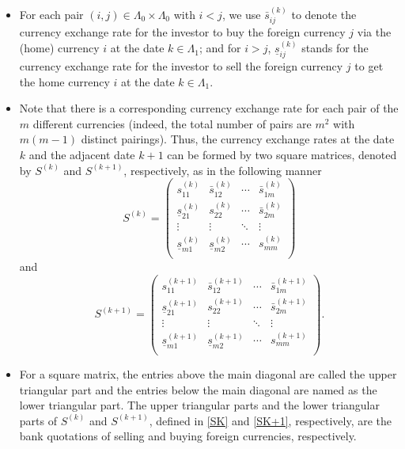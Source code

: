 \documentclass[11pt]{article}
\numberwithin{equation}{section}
\begin{document}
 \begin{itemize}
    \item For  each pair  $(i,j)\in\Lambda_0\times\Lambda_0$ with $i<j$,   we use $\bar s_{ij}^{(k)} $  to denote the currency exchange rate for the investor to buy the  foreign currency $j$ via the (home) currency $i$ at the date $k\in\Lambda_1$; and  
    for  $i>j$, $\underline s_{ij}^{(k)}$ stands for the currency exchange rate for the investor to sell the foreign currency $j$ to get the home currency $i$ at the date $k\in\Lambda_1$. 
    
 \item  Note that  there is a corresponding currency exchange rate for each pair of the  $m$ different currencies (indeed, the total number of  pairs are $m^2$ with 
 $m(m-1)$ distinct pairings). Thus,  the  currency exchange rates at the  date $k$ and the adjacent date  $k+1$ can be formed by two square matrices, denoted by $S^{(k)}$ and $S^{(k+1)}$, respectively,  
 as in the following manner 
\begin{equation}\label{SK}
S^{(k)}= \left(\begin{array}{ccccc}
s_{11}^{(k)} & \bar s_{12}^{(k)}&\cdots&\bar s_{1m}^{(k)}\\
\underline s_{21}^{(k)} & s_{22}^{(k)}&\cdots&\bar s_{2m}^{(k)}\\
\vdots & \vdots &\ddots&\vdots\\
\underline s_{m1}^{(k)} &\underline s_{m2}^{(k)}&\cdots&s_{mm}^{(k)}\\
\end{array}
\right) 
\end{equation}
and 
\begin{equation}\label{SK+1}
S^{(k+1)}= \left(\begin{array}{ccccc}
s_{11}^{(k+1)} & \bar s_{12}^{(k+1)}&\cdots&\bar s_{1m}^{(k+1)}\\
\underline s_{21}^{(k+1)} & s_{22}^{(k+1)}&\cdots&\bar s_{2m}^{(k+1)}\\
\vdots & \vdots &\ddots&\vdots\\
\underline s_{m1}^{(k+1)} &\underline s_{m2}^{(k+1)}&\cdots&s_{mm}^{(k+1)}\\
\end{array}
\right).
\end{equation}

\item For a square matrix, the entries above the main diagonal are called the upper triangular part and the entries below the main diagonal are named as the lower triangular part. The upper triangular parts  and the lower triangular parts of $S^{(k)}$ and $S^{(k+1)}$, defined in \eqref{SK}  and \eqref{SK+1}, respectively, are the bank quotations of selling and  buying foreign currencies, respectively. 


\end{itemize}
\end{document}
